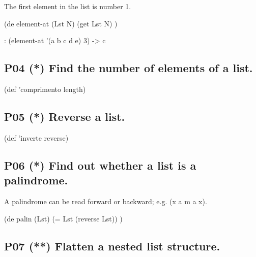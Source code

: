 The first element in the list is number 1.

\begin{wideverbatim}

(de element-at (Lst N)
   (get Lst N) )

\end{wideverbatim}

\begin{wideverbatim}
   : (element-at '(a b c d e) 3)
   -> c
\end{wideverbatim}

\subsection*{{P04} (*) Find the number of elements of a
list.}
\label{sec:99-problems-P04}

\begin{wideverbatim}

(def 'comprimento length)

\end{wideverbatim}

\subsection*{{P05} (*) Reverse a list.}
\label{sec:99-problems-P05}

\begin{wideverbatim}

(def 'inverte reverse)

\end{wideverbatim}

\subsection*{{P06} (*) Find out whether a list is a
palindrome.}
\label{sec:99-problems-P06}

A palindrome can be read forward or backward; e.g. (x a m a x).

\begin{wideverbatim}

(de palin (Lst)
   (= Lst (reverse Lst)) )

\end{wideverbatim}

\subsection*{{P07} (**) Flatten a nested list
structure.}
\label{sec:99-problems-P07}

